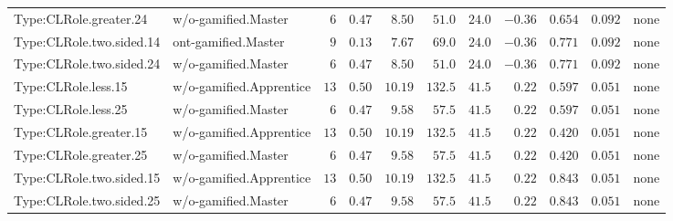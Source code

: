 \documentclass[6pt,a4paper]{article}
\begin{document}
{\begin{longtable}{llrrrrrrrrl}
Type:CLRole.greater.24&w/o-gamified.Master&$ 6$&$0.47$&$ 8.50$&$ 51.0$&$ 24.0$&$-0.36$&$0.654$&$0.092$&none\tabularnewline
Type:CLRole.two.sided.14&ont-gamified.Master&$ 9$&$0.13$&$ 7.67$&$ 69.0$&$ 24.0$&$-0.36$&$0.771$&$0.092$&none\tabularnewline
Type:CLRole.two.sided.24&w/o-gamified.Master&$ 6$&$0.47$&$ 8.50$&$ 51.0$&$ 24.0$&$-0.36$&$0.771$&$0.092$&none\tabularnewline
Type:CLRole.less.15&w/o-gamified.Apprentice&$13$&$0.50$&$10.19$&$132.5$&$ 41.5$&$ 0.22$&$0.597$&$0.051$&none\tabularnewline
Type:CLRole.less.25&w/o-gamified.Master&$ 6$&$0.47$&$ 9.58$&$ 57.5$&$ 41.5$&$ 0.22$&$0.597$&$0.051$&none\tabularnewline
Type:CLRole.greater.15&w/o-gamified.Apprentice&$13$&$0.50$&$10.19$&$132.5$&$ 41.5$&$ 0.22$&$0.420$&$0.051$&none\tabularnewline
Type:CLRole.greater.25&w/o-gamified.Master&$ 6$&$0.47$&$ 9.58$&$ 57.5$&$ 41.5$&$ 0.22$&$0.420$&$0.051$&none\tabularnewline
\newpage
Type:CLRole.two.sided.15&w/o-gamified.Apprentice&$13$&$0.50$&$10.19$&$132.5$&$ 41.5$&$ 0.22$&$0.843$&$0.051$&none\tabularnewline
Type:CLRole.two.sided.25&w/o-gamified.Master&$ 6$&$0.47$&$ 9.58$&$ 57.5$&$ 41.5$&$ 0.22$&$0.843$&$0.051$&none\tabularnewline
\hline
\end{longtable}}
\end{document}

